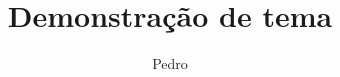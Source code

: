 \documentclass{beamer}
\title{Demonstração de tema}
\author{Pedro}
\begin{document}
\begin{frame}
  \titlepage
\end{frame}
\end{document}
